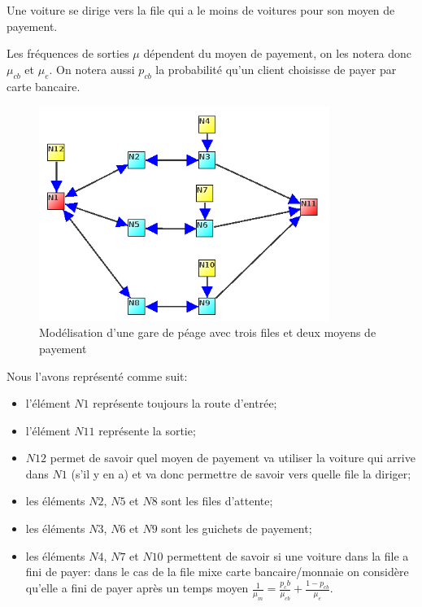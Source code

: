 \documentclass{scrartcl}
\begin{document}
      Une voiture se dirige vers la file qui a le moins de voitures pour son
      moyen de payement.

      Les fréquences de sorties $\mu$ dépendent du moyen de payement, on les
      notera donc $\mu_{cb}$ et $\mu_e$. On notera aussi $p_{cb}$ la
      probabilité qu'un client choisisse de payer par carte bancaire.

      \begin{figure}[htbp]
        \centering
        \includegraphics[height=7cm]{img/3_files.png}
        \caption{Modélisation d'une gare de péage avec trois files et deux
          moyens de payement}
        \label{figure:syphilis_3_2}
      \end{figure}

      Nous l'avons représenté comme suit:
      \begin{itemize}
        \item l'élément $N1$ représente toujours la route d'entrée;
        \item l'élément $N11$ représente la sortie;
        \item $N12$ permet de savoir quel moyen de payement va utiliser la
          voiture qui arrive dans $N1$ (s'il y en a) et va donc permettre de
          savoir vers quelle file la diriger;
        \item les éléments $N2$, $N5$ et $N8$ sont les files d'attente;
        \item les éléments $N3$, $N6$ et $N9$ sont les guichets de payement;
        \item les éléments $N4$, $N7$ et $N10$ permettent de savoir si une
          voiture dans la file a fini de payer: dans le cas de la file mixe
          carte bancaire/monnaie on considère qu'elle a fini de payer après un
          temps moyen $\frac 1 {\mu_m} = \frac{p_cb}{\mu_{cb}} +
          \frac{1-p_{cb}}{\mu_e}$.
      \end{itemize}
\end{document}
